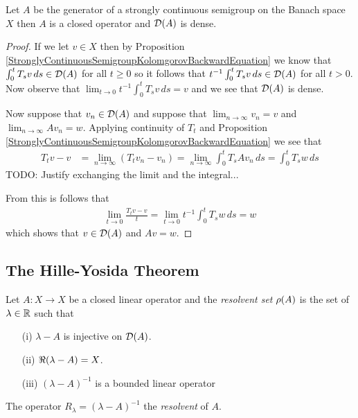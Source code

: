 \begin{cor}\label{StronglyContinuousSemigroupGeneratorClosedDomainDense}Let $A$ be the generator of a strongly continuous semigroup on the Banach space $X$ then $A$ is a closed operator and $\mathcal{D}(A)$ is dense.
\end{cor}
\begin{proof}
If we let $v \in X$ then by Proposition \ref{StronglyContinuousSemigroupKolomgorovBackwardEquation} we know that $\int_0^t T_s v \, ds \in \mathcal{D}(A)$ for all $t \geq 0$ so it follows that $t^{-1} \int_0^t T_s v \, ds \in \mathcal{D}(A)$ for all $t > 0$.  Now observe that $\lim_{t \to 0} t^{-1} \int_0^t T_s v \, ds = v$ and we see that $\mathcal{D}(A)$ is dense.

Now suppose that $v_n \in \mathcal{D}(A)$ and suppose that $\lim_{n \to \infty} v_n = v$ and $\lim_{n \to \infty} A v_n  = w$.  Applying continuity of $T_t$ and Proposition \ref{StronglyContinuousSemigroupKolomgorovBackwardEquation}  we see that 
\begin{align*}
T_t v - v &= \lim_{n \to \infty} (T_t v_n - v_n) = \lim_{n \to \infty} \int_0^t T_s A v_n \, ds = \int_0^t T_s w \, ds
\end{align*}
TODO: Justify exchanging the limit and the integral...

From this is follows that 
\begin{align*}
\lim_{t \to 0} \frac{T_t v - v}{t} = \lim_{t \to 0} t^{-1} \int_0^t T_s w \, ds = w
\end{align*}
which shows that $v \in \mathcal{D}(A)$ and $Av = w$.
\end{proof}

\subsection{The Hille-Yosida Theorem}

\begin{defn}Let $A : X \to X$ be a closed linear operator and the \emph{resolvent set} $\rho(A)$ is the set of $\lambda \in \mathbb{R}$ such that
\begin{itemize}
\item[(i)] $\lambda - A$ is injective on $\mathcal{D}(A)$.
\item[(ii)] $\Re(\lambda - A) = X$.
\item[(iii)] $(\lambda -A)^{-1}$ is a bounded linear operator
\end{itemize}
The operator $R_\lambda = (\lambda -A)^{-1}$ the \emph{resolvent} of $A$.
\end{defn}

